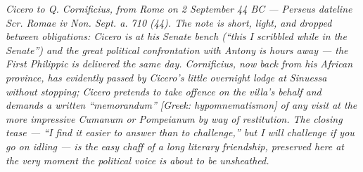 
\textit{Cicero to Q. Cornificius, from Rome on 2 September 44 BC ---
Perseus dateline \textit{Scr. Romae iv Non. Sept. a. 710 (44)}. The note
is short, light, and dropped between obligations: Cicero is at his
Senate bench (``this I scribbled while in the Senate'') and the great
political confrontation with Antony is hours away --- the
\textit{First Philippic} is delivered the same day. Cornificius, now back
from his African province, has evidently passed by Cicero's little
overnight lodge at Sinuessa without stopping; Cicero pretends to take
offence on the villa's behalf and demands a written ``memorandum''
\textit{[Greek: hypomnematismon]} of any visit at the more impressive
Cumanum or Pompeianum by way of restitution. The closing tease ---
``I find it easier to answer than to challenge,'' but I will challenge
if you go on idling --- is the easy chaff of a long literary friendship,
preserved here at the very moment the political voice is about to be
unsheathed.}
